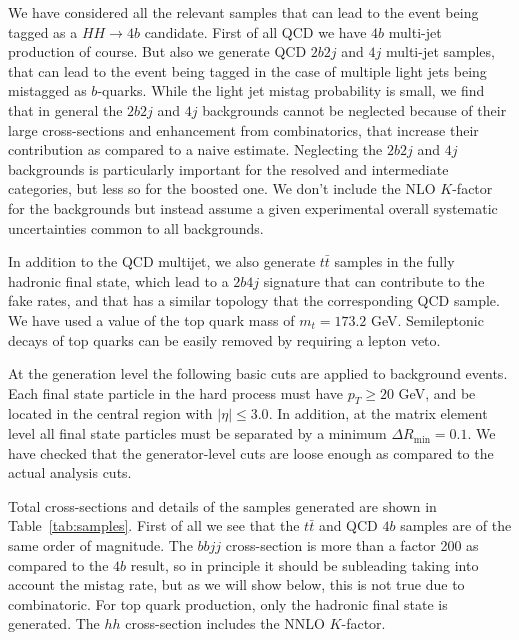 We have considered all the relevant samples that can lead to the event
being tagged as a $HH\to 4b$ candidate.
%
First of all QCD we have $4b$ multi-jet production of course.
%
But also we generate QCD $2b2j$ and $4j$ multi-jet samples,
that can lead to the event being tagged in the case of multiple light
jets being mistagged as $b$-quarks.
%
While the light jet mistag probability is small, we find that
in general the $2b2j$ and $4j$ backgrounds cannot be neglected because
of their large cross-sections and enhancement from combinatorics, that
increase their contribution as compared to a naive estimate.
%
Neglecting the  $2b2j$ and $4j$ backgrounds is particularly
important for the resolved and intermediate categories, but less
so for the boosted one.
%
We don't include the NLO $K$-factor for the backgrounds but instead assume
a given experimental overall systematic uncertainties common to all backgrounds.

In addition to the QCD multijet, we also generate $t\bar{t}$ samples
in the fully hadronic final state, which lead to a $2b4j$ signature that can
contribute to the fake rates, and that has a similar topology that
the corresponding QCD sample.
%
We have used a value of the top quark mass of $m_t=173.2$ GeV.
%
Semileptonic decays of top quarks can be easily removed by requiring
a lepton veto.


At the generation level the following basic cuts are applied to
background events.
%
Each final state particle in the hard process must have $p_T \ge 20$ GeV, and be located
in the central region with
$| \eta | \le 3.0$.
%
In addition, at the matrix element level
all final state particles must be separated by a minimum $\Delta R_{\mathrm{min}} =0.1$.
%
We have checked that the generator-level cuts are loose enough as compared to the actual
analysis cuts.
%


Total cross-sections and details of the samples generated are shown in Table~\ref{tab:samples}.
%
First of all we see that the $t\bar{t}$ and QCD $4b$ samples are of
the same order of magnitude.
%
The $bbjj$ cross-section is more than a factor 200 as compared to the
$4b$ result, so in principle it should be subleading taking into
account the mistag rate, but as we will show below,
this is not true due to combinatoric.
%
 For top quark production, only the hadronic final state is generated.
The $hh$ cross-section includes the NNLO $K$-factor.


